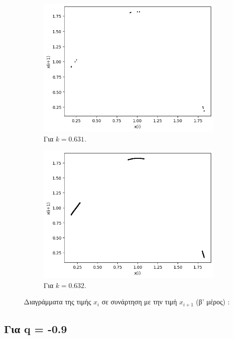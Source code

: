 \begin{figure}[h!]
\begin{subfigure}[b]{0.4\textwidth}
		\includegraphics[width=\textwidth]{LateX images/graphs q07/g12}
		\caption{Για $k=0.631$.}
		\label{f:k46}
	\end{subfigure}
	\hfill
	\begin{subfigure}[b]{0.4\textwidth}
	\centering
	\includegraphics[width=\textwidth]{LateX images/graphs q07/g13}
	\caption{Για $k=0.632$.}
	\label{f:k47}
	\end{subfigure}
\caption{Διαγράμματα της τιμής \(x_i\) σε συνάρτηση με την τιμή \(x_{i+1}\) (β' μέρος) :}	
\end{figure}

\clearpage

\subsection{Για q = -0.9}

